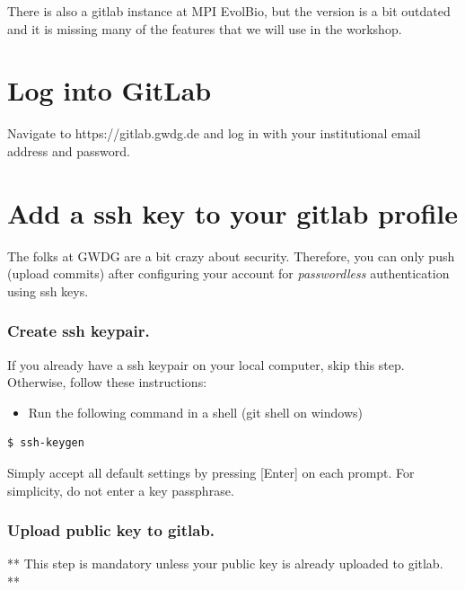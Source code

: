 \documentclass[11pt]{article}
\providecommand{\tightlist}{%
      \setlength{\itemsep}{0pt}\setlength{\parskip}{0pt}}
\begin{document}
There is also a gitlab instance at MPI EvolBio, but the version is a bit
outdated and it is missing many of the features that we will use in the
workshop.

    \hypertarget{log-into-gitlab}{%
\section{Log into GitLab}\label{log-into-gitlab}}

Navigate to https://gitlab.gwdg.de and log in with your institutional
email address and password.

    \hypertarget{add-a-ssh-key-to-your-gitlab-profile}{%
\section{Add a ssh key to your gitlab
profile}\label{add-a-ssh-key-to-your-gitlab-profile}}

The folks at GWDG are a bit crazy about security. Therefore, you can
only push (upload commits) after configuring your account for
\emph{passwordless} authentication using ssh keys.

\hypertarget{create-ssh-keypair.}{%
\subsubsection{Create ssh keypair.}\label{create-ssh-keypair.}}

If you already have a ssh keypair on your local computer, skip this
step. Otherwise, follow these instructions:

\begin{itemize}
\tightlist
\item
  Run the following command in a shell (git shell on windows)
\end{itemize}

\begin{verbatim}
$ ssh-keygen
\end{verbatim}

Simply accept all default settings by pressing {[}Enter{]} on each
prompt. For simplicity, do not enter a key passphrase.

\hypertarget{upload-public-key-to-gitlab.}{%
\subsubsection{Upload public key to
gitlab.}\label{upload-public-key-to-gitlab.}}

** This step is mandatory unless your public key is already uploaded to
gitlab. **
\end{document}
